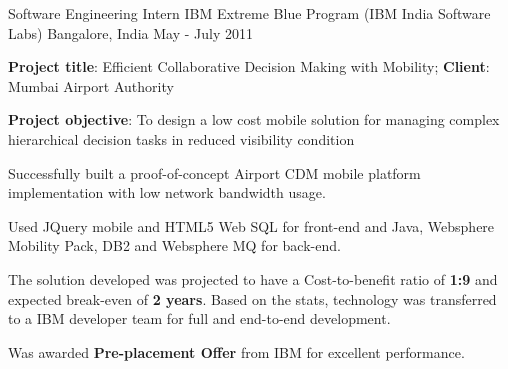 \begin{cventries}
  \cventry
    {Software Engineering Intern} %
    {IBM Extreme Blue Program (IBM India Software Labs)} %
    {Bangalore, India} %
    {May - July 2011} %
    {
      \begin{cvitems} %
        \item {\textbf{Project title}: Efficient Collaborative Decision Making with Mobility; \textbf{Client}: Mumbai Airport Authority}
        \item {\textbf{Project objective}: To design a low cost mobile solution for managing complex hierarchical decision tasks in reduced visibility condition}
        \item {Successfully built a proof-of-concept Airport CDM mobile platform implementation with low network bandwidth usage.}
        \item {Used JQuery mobile and HTML5 Web SQL for front-end and Java, Websphere Mobility Pack, DB2 and Websphere MQ for back-end.}
        \item {The solution developed was projected to have a Cost-to-benefit ratio of \textbf{1:9} and expected break-even of \textbf{2 years}. Based on the stats, technology was transferred to a IBM developer team for full and end-to-end development.}
        \item {Was awarded \textbf{Pre-placement Offer} from IBM for excellent performance.}
      \end{cvitems}
    }

\end{cventries}
